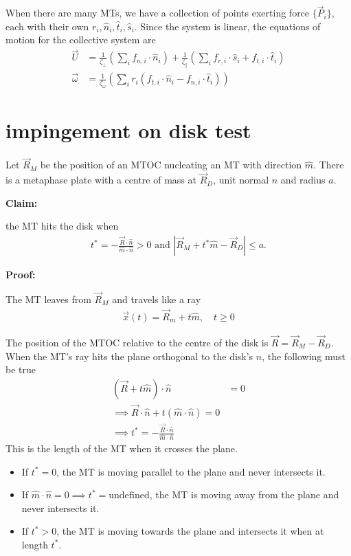 \documentclass[footheight=20pt, footsepline, headheight=20pt, headsepline]{scrartcl}
\begin{document}
	When there are many MTs, we have a collection of points exerting force $\{ \vec{P}_i \}$, each with their own $r_i, \hat{n}_i, \hat{t}_i ,  \hat{s}_i $.
	Since the system is linear, the equations of motion for the collective system are
	\begin{align}
		\vec{U} &= \frac{1}{\zeta_\perp} \left( \sum_i f_{n, i} \cdot \hat{n}_i \right) + \frac{1}{\zeta_\parallel} \left( \sum_i f_{r, i} \cdot \hat{s}_i + f_{t,i} \cdot \hat{t}_i \right) \\
		\vec{\omega} &= \frac{1}{\zeta_\omega} \left( \sum_i r_i ( f_{t,i} \cdot \hat{n}_i - f_{n,i} \cdot \hat{t}_i) \right)
	\end{align}

\newpage
\section{impingement on disk test}

	Let $\vec{R}_M$ be the position of an MTOC nucleating an MT with direction $\hat{m}$.
	There is a metaphase plate with a centre of mass at $\vec{R}_D$, unit normal $\hat{n}$ and radius $a$.

	\textbf{Claim:}

	the MT hits the disk when 
	\begin{align}
		t^* = -\frac{\vec{R} \cdot \hat{n}}{\hat{m} \cdot \hat{n}} > 0 \text{ and } |\vec{R}_M + t^* \hat{m} - \vec{R}_D| \leq a.
	\end{align}

	\textbf{Proof:}
	
	The MT leaves from $\vec{R}_M$ and travels like a ray
	\begin{align}
		\vec{x}(t) = \vec{R}_m + t \hat{m}, \quad t \geq 0
	\end{align}
	
	The position of the MTOC relative to the centre of the disk is $ \vec{R} = \vec{R}_M - \vec{R}_D$.
	When the MT's ray hits the plane orthogonal to the disk's $\hat{n}$, the following must be true
	\begin{align}
		\left( \vec{R} + t \hat{m} \right) \cdot \hat{n} &= 0 \\
		\implies \vec{R} \cdot \hat{n} + t (\hat{m} \cdot \hat{n}) = 0 \\
		\implies t^* = -\frac{\vec{R} \cdot \hat{n}}{\hat{m} \cdot \hat{n}}
	\end{align}
	This is the length of the MT when it crosses the plane.
	\begin{itemize}
		\item If $t^* = 0$, the MT is moving parallel to the plane and never intersects it.
		\item If $\hat{m} \cdot \hat{n} = 0 \implies t^* = \text{undefined}$, the MT is moving away from the plane and never intersects it.
		\item If $t^* > 0$, the MT is moving towards the plane and intersects it when at length $t^*$.
	\end{itemize}
\end{document}
